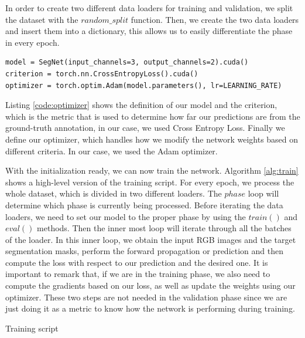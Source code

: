 In order to create two different data loaders for training and validation, we split the dataset with the $random\_split$ function. Then, we create the two data loaders and insert them into a dictionary, this allows us to easily differentiate the phase in every epoch.

\begin{lstlisting}[style=Python-color, caption=Model criterion and optimizer definition, frame=single, label=code:optimizer]
model = SegNet(input_channels=3, output_channels=2).cuda()
criterion = torch.nn.CrossEntropyLoss().cuda()
optimizer = torch.optim.Adam(model.parameters(), lr=LEARNING_RATE)

\end{lstlisting}

Listing \ref{code:optimizer} shows the definition of our model and the criterion, which is the metric that is used to determine how far our predictions are from the ground-truth annotation, in our case, we used Cross Entropy Loss. Finally we define our optimizer, which handles how we modify the network weights based on different criteria. In our case, we used the Adam optimizer.

With the initialization ready, we can now train the network. Algorithm \ref{alg:train} shows a high-level version of the training script. For every epoch, we process the whole dataset, which is divided in two different loaders. The $phase$ loop will determine which phase is currently being processed. Before iterating the data loaders, we need to set our model to the proper phase by using the $train()$ and $eval()$ methods. Then the inner most loop will iterate through all the batches of the loader. In this inner loop, we obtain the input RGB images and the target segmentation masks, perform the forward propagation or prediction and then compute the loss with respect to our prediction and the desired one. It is important to remark that, if we are in the training phase, we also need to compute the gradients based on our loss, as well as update the weights using our optimizer. These two steps are not needed in the validation phase since we are just doing it as a metric to know how the network is performing during training.\newline

\begin{algorithm}[!ht]
	\DontPrintSemicolon
	\caption{Training script}
	\label{alg:train}
\end{algorithm}

